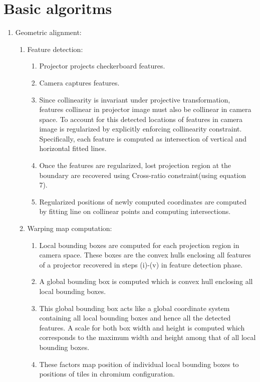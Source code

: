 \documentclass{article}
\begin{document}
\section{Basic algoritms}
\begin{enumerate}
\item Geometric alignment:
\begin{enumerate}    
\item Feature detection:
\begin{enumerate}
\item Projector projects checkerboard features.
\item Camera captures features.
\item Since collinearity is invariant under projective transformation, features collinear in projector image must also be 		      collinear in camera space. To account for this detected locations of features in camera image is regularized by explicitly enforcing collinearity constraint. Specifically, each feature is computed as intersection of vertical and horizontal fitted lines.

\item Once the features are regularized, lost projection region at the boundary are recovered using Cross-ratio constraint(using equation 7).
\item Regularized positions of newly computed coordinates are computed by fitting line on collinear points and computing intersections.
\end{enumerate}
\item Warping map computation:
\begin{enumerate}	     
\item Local bounding boxes are computed for each projection region in camera space. These boxes are the convex hulls enclosing all features of a projector recovered in steps (i)-(v) in feature detection phase.

\item A global bounding box is computed which is convex hull enclosing all local bounding boxes.

\item This global bounding box acts like a global coordinate system containing all local bounding boxes and hence all the 		      detected features. A scale for both box width and height is computed which corresponds to the maximum width and height among that of all local bounding boxes.
 
\item These factors map position of individual local bounding boxes to positions of tiles in chromium configuration.


\end{enumerate}
\end{enumerate}
\end{enumerate}
\end{document}
